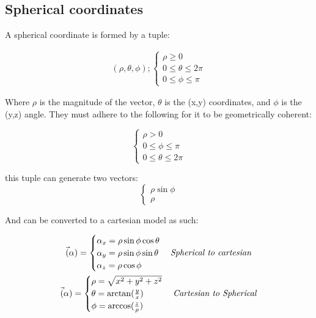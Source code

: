 \documentclass[11pt,fleqn]{book} %
\begin{document}
\subsection{Spherical coordinates}

A spherical coordinate is formed by a tuple:

\begin{gather}
    (\rho, \theta ,\phi);
    \begin{cases}
        \rho \geq  0 \\
        0 \le \theta \le 2\pi \\
        0 \le \phi \le \pi    
    \end{cases}
\end{gather}

Where $ \rho $ is the magnitude of the vector, $\theta$ is the (x,y) coordinates, and
$\phi$ is the (y,z) angle. They must adhere to the following for it to be geometrically coherent:

\begin{equation}
    \begin{cases}
        \rho > 0 \\
        0 \le \phi \le \pi \\
        0 \le \theta \le 2\pi
    \end{cases}
\end{equation}

this tuple can generate two vectors:
\begin{equation}
    \begin{cases}
        \rho \sin \phi\\
        \rho
    \end{cases}
\end{equation}

And can be converted to a cartesian model as such:

\begin{gather}
    \vec(\alpha) =
    \begin{cases}
        \alpha_x = \rho \sin \phi \cos \theta \\
        \alpha_y = \rho \sin \phi \sin \theta \\
        \alpha_z = \rho \cos \phi
    \end{cases}
    \text{\textit{Spherical to cartesian}} \\ 
    \vec(\alpha) =
    \begin{cases}
        \rho = \sqrt{x^2 + y^2 + z^2} \\
        \theta =  \arctan(\frac{y}{x}) \\
        \phi = \arccos(\frac{z}{\rho})
    \end{cases}
    \text{\textit{Cartesian to Spherical}}
\end{gather}
\end{document}
